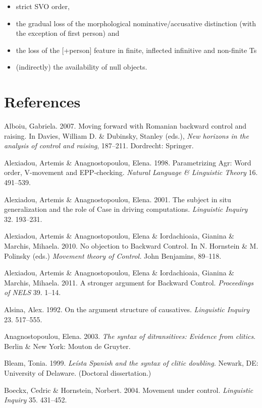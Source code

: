 \documentclass[output=paper]{langsci/langscibook}
\begin{document}
\begin{itemize}
\item strict SVO order, 
\item the gradual loss of the morphological nominative/accusative distinction (with the exception of first person) and 
\item the loss of the [+person] feature in finite, inflected infinitive and non-finite Ts
\item (indirectly) the availability of null objects. 
\end{itemize}
\section{ References}

Alboiu, Gabriela. 2007. Moving forward with Romanian backward control and raising. In Davies, William D. \& Dubinsky, Stanley (eds.), \textit{New horizons in the analysis of control and raising}, 187–211. Dordrecht: Springer.  

Alexiadou, Artemis \& Anagnostopoulou, Elena. 1998. Parametrizing Agr: Word order, V-movement and EPP-checking. \textit{Natural Language \& Linguistic Theory} 16. 491–539. 

Alexiadou, Artemis \& Anagnostopoulou, Elena. 2001. The subject in situ generalization and the role of Case in driving computations. \textit{Linguistic Inquiry} 32. 193–231. 

Alexiadou, Artemis \& Anagnostopoulou, Elena \& Iordachioaia, Gianina \& Marchis, Mihaela. 2010. No objection to Backward Control. In N. Hornstein \& M. Polinsky (eds.) \textit{Movement theory of Control.} John Benjamins, 89–118. 

Alexiadou, Artemis \& Anagnostopoulou, Elena \& Iordachioaia, Gianina \& Marchis, Mihaela. 2011. A stronger argument for Backward Control. \textit{Proceedings of NELS} 39. 1–14.

Alsina, Alex. 1992. On the argument structure of causatives. \textit{Linguistic Inquiry} 23. 517–555.

Anagnostopoulou, Elena. 2003. \textit{The syntax of ditransitives: Evidence from clitics}. Berlin \& New York: Mouton de Gruyter.

Bleam, Tonia. 1999. \textit{Leísta Spanish and the syntax of clitic doubling.} Newark, DE: University of Delaware. (Doctoral dissertation.)

Boeckx, Cedric \& Hornstein, Norbert. 2004. Movement under control. \textit{Linguistic Inquiry} 35. 431–452. 
\end{document}
